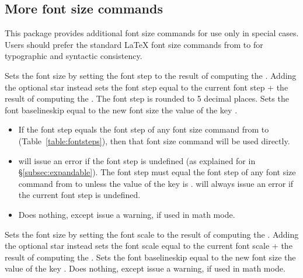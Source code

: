 \documentclass{beery}
\begin{document}
\subsection{More font size commands}
\label{subsec:fontsize}

This package provides additional font size commands for use only in special cases.
Users should prefer the standard \LaTeX{} font size commands from  to  for typographic and syntactic consistency.

 \sarg{} 
\KeepNextPar*

Sets the font size by setting the font step to the result of computing the .
Adding the optional star instead sets the font step equal to the current font step + the result of computing the .
The font step is rounded to \num{5} decimal places.
Sets the font baselineskip equal to the new font size \texttimes{} the value of the key .

\begin{itemize}
  \item
  If the font step equals the font step of any font size command from  to  (Table~\ref{table:fontsteps}), then that font size command will be used directly.
  \item
   will issue an error if the font step is undefined (as explained for  in \S\ref{subsec:expandable}).
  The font step must equal the font step of any font size command from  to  unless the value of the key  is .
   will always issue an error if the current font step is undefined.
  \item
  Does nothing, except issue a warning, if used in math mode.
\end{itemize}

 \sarg{} 
\KeepNextPar*

Sets the font size by setting the font scale to the result of computing the .
Adding the optional star instead sets the font scale equal to the current font scale + the result of computing the .
Sets the font baselineskip equal to the new font size \texttimes{} the value of the key .
Does nothing, except issue a warning, if used in math mode.
\end{document}
